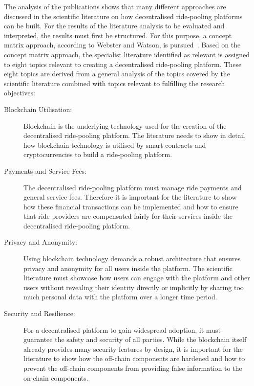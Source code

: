The analysis of the publications shows that many different approaches are discussed in the scientific literature on how decentralised ride-pooling platforms can be built. For the results of the literature analysis to be evaluated and interpreted, the results must first be structured. For this purpose, a concept matrix approach, according to Webster and Watson, is pursued~\cite{Webster.2002}. Based on the concept matrix approach, the specialist literature identified as relevant is assigned to eight topics relevant to creating a decentralised ride-pooling platform. These eight topics are derived from a general analysis of the topics covered by the scientific literature combined with topics relevant to fulfilling the research objectives:

\begin{description}
    \item[Blockchain Utilisation:] Blockchain is the underlying technology used for the creation of the decentralised ride-pooling platform. The literature needs to show in detail how blockchain technology is utilised by smart contracts and cryptocurrencies to build a ride-pooling platform.
    
    \item[Payments and Service Fees:] The decentralised ride-pooling platform must manage ride payments and general service fees. Therefore it is important for the literature to show how these financial transactions can be implemented and how to ensure that ride providers are compensated fairly for their services inside the decentralised ride-pooling platform.
    
    \item[Privacy and Anonymity:] Using blockchain technology demands a robust architecture that ensures privacy and anonymity for all users inside the platform. The scientific literature must showcase how users can engage with the platform and other users without revealing their identity directly or implicitly by sharing too much personal data with the platform over a longer time period.
    
    \item[Security and Resilience:] For a decentralised platform to gain widespread adoption, it must guarantee the safety and security of all parties. While the blockchain itself already provides many security features by design, it is important for the literature to show how the off-chain components are hardened and how to prevent the off-chain components from providing false information to the on-chain components.
    

\end{description}
